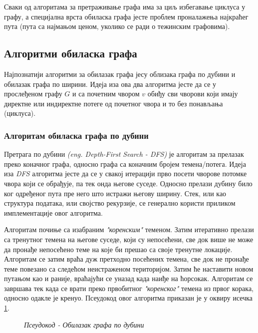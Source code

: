 \par
Сваки од алгоритама за претраживање графа има за циљ избегавање циклуса у графу, а специјална врста обиласка графа јесте проблем проналажења најкраћег пута (пута са најмањом ценом, уколико се ради о тежинским графовима).

\subsection{Алгоритми обиласка графа}
Најпознатији алгоритми за обилазак графа јесу облизака графа по дубини и обилазак графа по ширини. Идеја иза ова два алгоритма јесте да се у прослеђеном графу $G$ и са почетним чвором $v$ обиђу сви чворови који имају директне или индиректне потеге од почетног чвора и то без понављања (циклуса).

\subsubsection{Алгоритам обиласка графа по дубини}
Претрага по дубини \textit{(eng. Depth-First Search - DFS)} је алгоритам за прелазак преко коначног графа, односно графа са коначним бројем темена/потега. Идеја иза \textit{DFS} алгоритма јесте да се у свакој итерацији прво посети чворове потомке чвора који се обрађује, па тек онда његове суседе. Односно прелази дубину било ког одређеног пута пре него што истражи његову ширину. Стек, или као структура података, или својство рекурзије, се генерално користи приликом имплементације овог алгоритма.

\par
Алгоритам почиње са изабраним \textit{"коренским"} теменом. Затим итеративно прелази са тренутног темена на његове суседе, који су непосећени, све док више не може да пронађе непосећено теме на које би прешао са своје тренутне локације. Алгоритам се затим враћа дуж претходно посећених темена, све док не пронађе теме повезано са следећом неистраженом територијом. Затим ће наставити новом путањом као и раније, враћајући се уназад када наиђе на ћорсокак. Алгоритам се завршава тек када се врати преко првобитног \textit{"коренског"} темена из првог корака, односно одакле је кренуо. Псеудокод овог алгоритма приказан је у оквиру исечка \ref{pseudocode:algorithm-dfs-traversal-pseudo}.

\begin{figure}[!ht]
\centering

\caption{\textit{Псеудокод - Обилазак графа по дубини}}
\label{pseudocode:algorithm-dfs-traversal-pseudo}
\end{figure}

